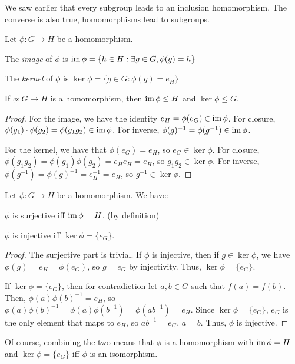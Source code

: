 \documentclass[12pt]{article}
\begin{document}
We saw earlier that every subgroup 
leads to an inclusion homomorphism.
The converse is also true, homomorphisms
lead to subgroups.

\begin{definition}
    Let $\phi : G \to H$ be a homomorphism.
    \begin{compactenum}[(i)]
    \item The \emph{image} of $\phi$ is $\operatorname{im}\phi = \{ h \in H : \exists g \in G, \phi(g) = h\}$
    \item The \emph{kernel} of $\phi$ is $\ker\phi = \{g \in G : \phi(g) = e_H\}$
    \end{compactenum}
\end{definition}

\begin{prop}
    If $\phi : G \to H$ is a homomorphism,
    then $\operatorname{im}\phi \le H$ and $\ker\phi \le G$.
\end{prop}
\begin{proof}
    For the image, we have the identity $e_H = \phi(e_G) \in \operatorname{im}\phi$.
    For closure, $\phi(g_{1})\cdot\phi(g_{2}) = \phi(g_{1}g_{2}) \in \operatorname{im}\phi$.
    For inverse, $\phi(g)^{-1} = \phi(g^{-1}) \in \operatorname{im}\phi$.

    For the kernel, we have that $\phi(e_G) = e_H$, so $e_G \in \ker\phi$.
    For closure, $\phi(g_{1}g_{2}) = \phi(g_{1})\phi(g_{2}) = e_He_H = e_H$, so $g_{1}g_{2} \in \ker\phi$.
    For inverse, $\phi(g^{-1}) = \phi(g)^{-1} = e_H^{-1} = e_H$, so $g^{-1} \in \ker\phi$.
\end{proof}

Let $\phi : G \to H$ be a homomorphism. We have:
\begin{compactenum}[(i)]
\item $\phi$ is surjective iff $\operatorname{im}\phi = H$. (by definition)
\item $\phi$ is injective iff $\ker\phi = \{e_G\}$.
\end{compactenum}
\begin{proof}
    The surjective part is trivial.
    If $\phi$ is injective, then if $g \in \ker\phi$,
    we have $\phi(g) = e_H = \phi(e_G)$, so $g = e_G$ by injectivity.
    Thus, $\ker\phi = \{e_G\}$.

    If $\ker\phi = \{e_G\}$, then for contradiction
    let $a,b \in G$ such that $f(a) = f(b)$.
    Then, $\phi(a)\phi(b)^{-1} = e_H$, so 
    $\phi(a)\phi(b)^{-1} = \phi(a)\phi(b^{-1}) = \phi(ab^{-1}) = e_H$.
    Since $\ker\phi = \{e_G\}$, $e_G$ is the only element
    that maps to $e_H$, so $ab^{-1} = e_G$, $a = b$.
    Thus, $\phi$ is injective.
\end{proof}
Of course, combining the two means that
$\phi$ is a homomorphism with $\operatorname{im}\phi = H$ and $\ker\phi = \{e_G\}$
iff $\phi$ is an isomorphism.
\end{document}
